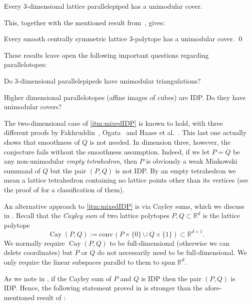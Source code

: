 \documentclass[12pt]{article}
\newcommand{\R}{ \ensuremath{\mathbb{R}}}
\newcommand{\conv}{\ensuremath{\mathrm{conv}}\hspace{1pt}}
\newcommand{\cayley}{\operatorname{Cay}}
\begin{document}
\begin{theorem}
\label{thm:parallelepipeds}
Every $3$-dimensional lattice parallelepiped has a unimodular cover.
\end{theorem}

This, together with the mentioned result from~\cite{BHHHJKM2019}, gives:

\begin{corollary}
\label{coro:3cs}
Every smooth centrally symmetric lattice $3$-polytope has a unimodular cover. 
\qed
\end{corollary}

These results leave open the following important questions regarding parallelotopes:

\begin{question}
Do $3$-dimensional parallelepipeds have unimodular triangulations?
\end{question}

\begin{question}
Higher dimensional parallelotopes (affine images of cubes) are IDP. Do they have unimodular covers? 
\end{question}


The two-dimensional case of \eqref{itm:mixedIDP} is known to hold, with three different proofs by Fakhruddin~\cite{Fakhruddin}, Ogata~\cite{Ogata} and Haase et al.~\cite{HNPS2008}. This last one actually shows that smoothness of $Q$ is not needed. In dimension three, however, the conjecture fails without the smoothness assumption. Indeed, if we let $P=Q$ be any non-unimodular \emph{empty tetrahedron}, then $P$ is obviously a weak Minkowski summand of $Q$ but the pair $(P, Q)$ is not IDP. By an empty tetrahedron we mean a lattice tetrahedron containing no lattice points other than its vertices (see the proof of  for a classification of them).

An alternative approach to \eqref{itm:mixedIDP} is via Cayley sums, which we discuss in  . 
Recall that the \emph{Cayley sum} of two lattice polytopes $P,Q\subset \R^d$ is the lattice polytope
\[
\cayley(P,Q) := \conv(P\times\{0\} \cup Q \times \{1\}) \subset \R^{d+1}.
\]
We normally require $\cayley(P,Q)$ to be full-dimensional (otherwise we can delete coordinates) but $P$ or $Q$ do not necessarily need to be full-dimensional. We only require the linear subspaces parallel to them to span $\R^d$.

As we note in , if the Cayley sum of $P$ and $Q$ is IDP then the pair $(P,Q)$ is IDP.
Hence, the following statement proved in  is stronger than the afore-mentioned result of \cite{Fakhruddin,HNPS2008,Ogata}:
\end{document}
